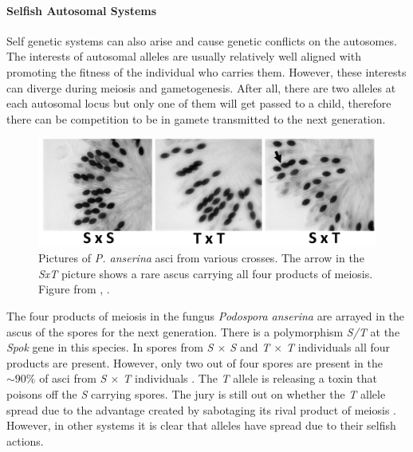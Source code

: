 {\paragraph{Selfish Autosomal Systems}
Self genetic systems can also arise and cause genetic conflicts on the
autosomes. The interests of autosomal alleles are usually relatively
well aligned with promoting the fitness of the individual who carries them. However, these interests can
diverge during meiosis and gametogenesis. After all, there are two
alleles at each autosomal locus but only one of them will get passed
to a child, therefore there can be competition to be in gamete transmitted to the next generation.
 \begin{figure}
\begin{center}
\includegraphics[width= \textwidth]{Journal_figs/single_locus_selection/ascus_spore_killer/Grognet_spore_killer.png}
\end{center}
\caption{
Pictures of {\it P. anserina} asci from various crosses. The arrow in the
{\it SxT} picture shows a rare  ascus carrying all four products of
meiosis. Figure from \citet{grognet2014genes}, \PLOSccBY. 
 } \label{fig:spore_killer}
\end{figure}
  

The four products of meiosis in the fungus {\it Podospora anserina}
are arrayed in the ascus
of the spores for the next generation. There is a polymorphism {\it S/T} at
the {\it Spok} gene in this species. In
spores from {\it S $\times$ S} and {\it T $\times$ T} individuals all four products are
present. However, only two out of four spores are present in the
$\sim 90\%$ of asci from {\it S $\times$ T} individuals
\citep{grognet2014genes}. The {\it T} allele is releasing
a toxin that poisons off the {\it S} carrying spores. The jury is still out
on whether the {\it T} allele spread due to the advantage created by
sabotaging its rival product of meiosis \citep{sweigart2019making}. However, in other systems it
is clear that alleles have spread due to their selfish actions. 

}
